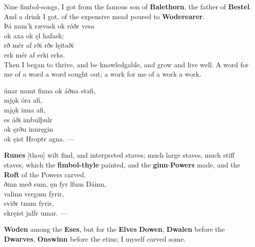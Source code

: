 \bvb Nine fimbol-songs, I got from the famous son of \textbf{Balethorn}, the father of \textbf{Bestel}. And a drink I got, of the expensive mead poured to \textbf{Woderearer}. \\

\bva Þá nam'k rævask \hld ok róðr vesa \\%
\ind ok axa ok ęl hafask; \\%
rð mér af rði \hld {}rðs lęitaði \\%
\ind {}erk mér af erki erks.\\%

\bvb Then I began to thrive, and be knowledgable, and grow and live well. A word for me of a word a word sought out; a work for me of a work a work\footnotemark[10]. \\

\bva {}únar munt finna \hld ok áðna stafi, \\%
\ind mjǫk óra afi, \\%
\ind mjǫk inna afi, \\%
\ind es áði imbulþulr \\%
\ind ok ęrðu innręgin \\%
\ind ok ęist Hroptr agna\footnotemark[5]. —\\%

\bvb \textbf{Runes} [thou] wilt find, and interpreted staves; much large staves, much stiff staves, which the \textbf{fimbol-thyle} painted, and the \textbf{ginn}-\textbf{Powers} made, and the \textbf{Roft} of the Powers carved. \\

\bva {}ðinn með sum, \hld ęn fyr lfum Dáinn, \\%
\ind {}valinn vergum fyrir, \\%
\ind {}sviðr tnum fyrir, \\%
ek\footnotemark[10] ręist jalfr umar. —\\%

\bvb \textbf{Woden} among the \textbf{Eses}, but for the \textbf{Elves} \textbf{Dowen}, \textbf{Dwalen} before the \textbf{Dwarves}, \textbf{Onswinn} before the etins; I myself carved some. \\

